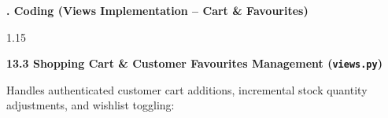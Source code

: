 \documentclass[12pt,a4paper]{article}
\begin{document}
\vfill

\newpage



\noindent
{\color{bcetblue}\textbf{\fontsize{14}{18}. Coding (Views Implementation -- Cart \& Favourites)}}

\vspace{0.08in}

{\fontsize{13}{18}\selectfont
\begin{spacing}{1.15}

\noindent
\textbf{13.3 Shopping Cart \& Customer Favourites Management (\texttt{views.py})}

\vspace{0.04in}

\noindent
{\fontsize{11}{14}\selectfont Handles authenticated customer cart additions, incremental stock quantity adjustments, and wishlist toggling:}

\end{spacing}
}

\vspace{0.06in}
\end{document}
